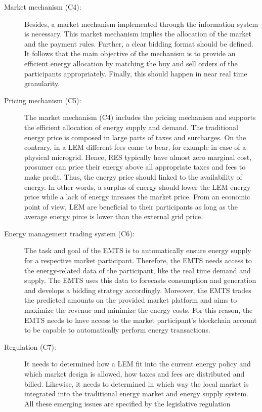 \begin{description}
    \item[Market mechanism (C4):] Besides, a market mechanism implemented through 
     the information system is necessary. This market mechanism implies the allocation of the
     market and the payment rules. Further, a clear bidding format should be defined. 
     It follows that the main objective of the mechanism is to provide an efficient
     energy allocation by matching the buy and sell orders of the participants appropriately.
     Finally, this should happen in near real time granularity.    
    
    \item[Pricing mechanism (C5):] The market mechanism (C4) includes the pricing mechanism 
     and supports the efficient allocation of energy supply and demand. 
     The traditional energy price is composed in large parts of taxes and surcharges.
     On the contrary, in a LEM different fees come to bear, for example in case of a 
     physical microgrid. Hence, RES typically have almost zero marginal cost, prosumer can 
     price their energy above all appropriate taxes and fees to make profit. 
    Thus, the energy price should linked to the availability of energy. In other words,
    a surplus of energy should lower the LEM energy price while a lack of energy inreases the 
    market price. From an economic point of view, LEM are beneficial to their 
    participants as long as the average energy pirce is lower than the external grid price.
        
    \item[Energy management trading system (C6):] The task and goal of the EMTS
     is to automatically ensure energy supply for a respective market participant.
     Therefore, the EMTS needs access to the energy-related data of the participant, like 
     the real time demand and supply. The EMTS uses this data to forecasts consumption and
     generation and develops a bidding strategy accordingly. 
     Moreover, the EMTS trades the predicted amounts on the provided market platform 
     and aims to maximize the revenue and minimize the energy costs. 
     For this reason, the EMTS needs to have access to the market participant’s
     blockchain account to be capable to automatically perform energy transactions.

    \item[Regulation (C7):] It needs to determined how a LEM 
     fit into the current energy policy and which market design is allowed, how 
     taxes and fees are distributed and billed. Likewise, it needs to 
     determined in which way the local market is integrated into the traditional
     energy market and energy supply system.
     All these emerging issues are specified by the legislative regulation
    
\end{description}

\begin{comment}
    # Mengelkamp \shortcite{mengelkamp2018designing}
    
    An exemplary microgrid energy market scenario of residential consumers and 
    prosumers (consumers with photovoltaic (PV) systems) is shown in Fig. 2. 

\end{comment}

\clearpage